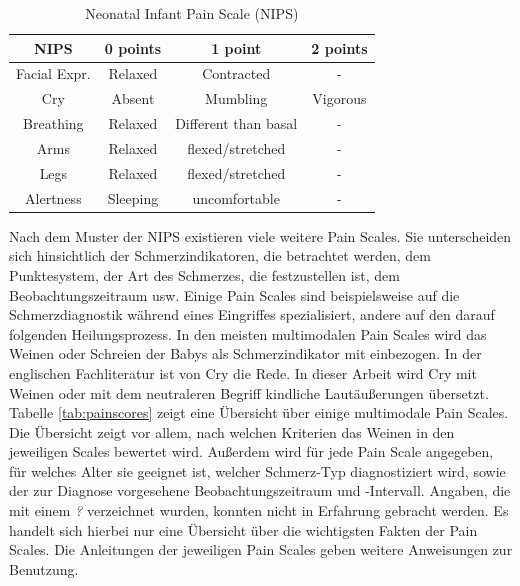 \begin{table}[h]
	\footnotesize
	\centering
	\caption{Neonatal Infant Pain Scale (NIPS) \cite{nips}}
	\label{tab:nips}
	\begin{tabular}{@{}cccc@{}}
		\toprule
		\textbf{NIPS}     & \textbf{0 points} & \textbf{1 point}     & \textbf{2 points} \\ \midrule
		Facial Expr. & Relaxed           & Contracted           & -                 \\
		Cry               & Absent            & Mumbling             & Vigorous          \\
		Breathing         & Relaxed           & Different than basal & -                 \\
		Arms              & Relaxed           & flexed/stretched     & -                 \\
		Legs              & Relaxed           & flexed/stretched     & -                 \\
		Alertness         & Sleeping          & uncomfortable        & -                 \\ \bottomrule
	\end{tabular}
\end{table}


Nach dem Muster der NIPS existieren viele weitere Pain Scales. Sie unterscheiden sich hinsichtlich der Schmerzindikatoren, die betrachtet werden, dem Punktesystem, der Art des Schmerzes, die festzustellen ist, dem Beobachtungszeitraum usw. Einige Pain Scales sind beispielsweise auf die Schmerzdiagnostik während eines Eingriffes spezialisiert, andere auf den darauf folgenden Heilungsprozess. In den meisten multimodalen Pain Scales wird das Weinen oder Schreien der Babys als Schmerzindikator mit einbezogen. In der englischen Fachliteratur ist von \glqq Cry\grqq{} die Rede.\cite[S. 97 - 98]{painInNeonates} In dieser Arbeit wird \glqq Cry\grqq{} mit \glqq Weinen\grqq{} oder mit dem neutraleren Begriff \glqq kindliche Lautäußerungen\grqq{} übersetzt. Tabelle \ref{tab:painscores} zeigt eine Übersicht über einige multimodale Pain Scales. Die Übersicht zeigt vor allem, nach welchen Kriterien das Weinen in den jeweiligen Scales bewertet wird. Außerdem wird für jede Pain Scale angegeben, für welches Alter sie geeignet ist, welcher Schmerz-Typ diagnostiziert wird, sowie der zur Diagnose vorgesehene Beobachtungszeitraum und -Intervall. Angaben, die mit einem \emph{?} verzeichnet wurden, konnten nicht in Erfahrung gebracht werden. Es handelt sich hierbei nur eine Übersicht über die wichtigsten Fakten der Pain Scales. Die Anleitungen der jeweiligen Pain Scales geben weitere Anweisungen zur Benutzung.

